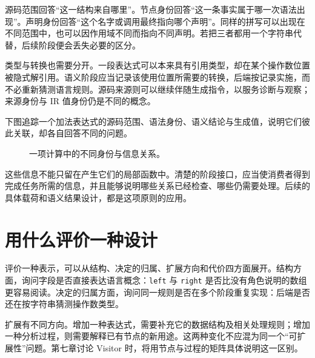 源码范围回答“这一结构来自哪里”。节点身份回答“这一条事实属于哪一次语法出现”。声明身份回答“这个名字或调用最终指向哪个声明”。同样的拼写可以出现在不同范围中，也可以因作用域不同而指向不同声明。若把三者都用一个字符串代替，后续阶段便会丢失必要的区分。

类型与转换也需要分开。一段表达式可以本来具有引用类型，却在某个操作数位置被隐式解引用。语义阶段应当记录该使用位置所需要的转换，后端按记录实施，而不必重新猜测语言规则。源码来源则可以继续伴随生成指令，以服务诊断与观察；来源身份与 IR 值身份仍是不同的概念。

下图追踪一个加法表达式的源码范围、语法身份、语义结论与生成值，说明它们彼此关联，却各自回答不同的问题。
\begin{figure}[htbp]
\centering
{}
\caption{一项计算中的不同身份与信息关系。}
\end{figure}
这些信息不能只留在产生它们的局部函数中。清楚的阶段接口，应当使消费者得到完成任务所需的信息，并且能够说明哪些关系已经检查、哪些仍需要处理。后续的具体载荷和语义结果设计，都是这项原则的应用。

\section{用什么评价一种设计}
评价一种表示，可以从结构、决定的归属、扩展方向和代价四方面展开。结构方面，询问字段是否直接表达语言概念：\texttt{left} 与 \texttt{right} 是否比没有角色说明的数组更容易阅读。决定的归属方面，询问同一规则是否在多个阶段重复实现：后端是否还在按字符串猜测操作数类型。

扩展有不同方向。增加一种表达式，需要补充它的数据结构及相关处理规则；增加一种分析过程，则需要解释已有节点的新用途。这两种变化不应混为同一个“可扩展性”问题。第七章讨论 Visitor 时，将用节点与过程的矩阵具体说明这一区别。

